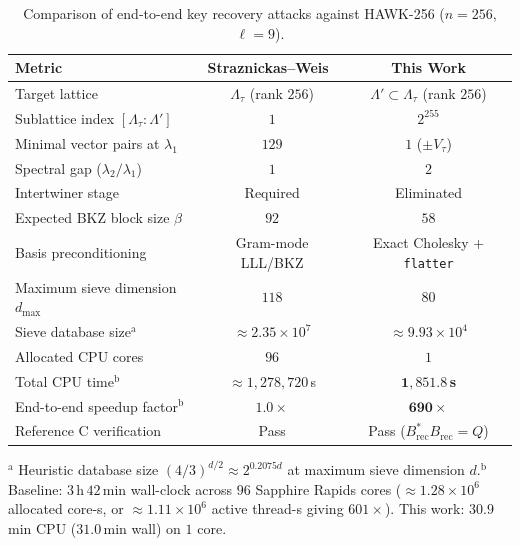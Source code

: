 \documentclass[11pt,a4paper]{article}
\theoremstyle{definition}
\newcommand{\Lt}{\Lambda_\tau}
\newcommand{\Lp}{\Lambda'}
\newcommand{\Vt}{V_\tau}
\begin{document}
\begin{table}[t]
\centering
\small
\caption{Comparison of end-to-end key recovery attacks against HAWK-256 ($n=256$, $\ell=9$).}
\label{tab:comparison}
\begin{tabular}{@{}lcc@{}}
\toprule
\textbf{Metric} & \textbf{Straznickas--Weis~\cite{SW26}} & \textbf{This Work} \\
\midrule
Target lattice & $\Lt$ (rank $256$) & $\Lp \subset \Lt$ (rank $256$) \\
Sublattice index $[\Lt : \Lp]$ & $1$ & $2^{255}$ \\
Minimal vector pairs at $\lambda_1$ & $129$ & $1$ ($\pm \Vt$) \\
Spectral gap ($\lambda_2 / \lambda_1$) & $1$ & $2$ \\
Intertwiner stage & Required & Eliminated \\
Expected BKZ block size $\beta$ & $92$ & $58$ \\
Basis preconditioning & Gram-mode LLL/BKZ & Exact Cholesky + \texttt{flatter} \\
Maximum sieve dimension $d_{\max}$ & $118$ & $80$ \\
Sieve database size$^{\mathrm{a}}$ & $\approx 2.35 \times 10^7$ & $\approx 9.93 \times 10^4$ \\
Allocated CPU cores & $96$ & $1$ \\
Total CPU time$^{\mathrm{b}}$ & $\approx 1{,}278{,}720$\,s & $\mathbf{1{,}851.8}$\,\textbf{s} \\
End-to-end speedup factor$^{\mathrm{b}}$ & $1.0\times$ & $\mathbf{690\times}$ \\
Reference C verification & Pass & Pass ($B_{\mathrm{rec}}^*B_{\mathrm{rec}}=Q$) \\
\bottomrule
\end{tabular}
\par\smallskip
{\scriptsize $^{\mathrm{a}}$ Heuristic database size $(4/3)^{d/2} \approx 2^{0.2075 d}$ at maximum sieve dimension $d$.\quad $^{\mathrm{b}}$ Baseline: $3$\,h\,$42$\,min wall-clock across $96$ Sapphire Rapids cores ($\approx 1.28\times 10^6$ allocated core-s, or $\approx 1.11\times 10^6$ active thread-s giving $601\times$). This work: $30.9$\,min CPU ($31.0$\,min wall) on $1$ core.}
\end{table}
\end{document}
